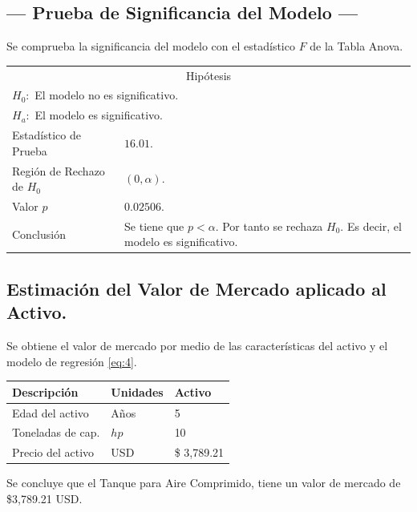 \subsection{\centering --- Prueba de Significancia del Modelo ---} %
Se comprueba la significancia del modelo con el estadístico \(F\) de la Tabla Anova.
\begin{center}
  \begin{tabular}{|l|p{6cm}|}
    \cline{1-2}
    \multicolumn{2}{|c|}{Hipótesis}\\ \cline{1-2}
    \multicolumn{2}{|l|}{\(H_0:\) El modelo no es significativo.} \\ 
    \multicolumn{2}{|l|}{\(H_a:\) El modelo es significativo.} \\ \cline{1-2}
    Estadístico de Prueba & \(16.01\).\\ \cline{1-2} 
		Región de Rechazo de \(H_0\) & \((0, \alpha )\).\\ \cline{1-2} 
    Valor \(p\) & \(0.02506\).\\ \cline{1-2} 
    Conclusión & Se tiene que \(p<\alpha\). \newline 
		Por tanto se rechaza \(H_0\). \newline 
		Es decir, el modelo es significativo.\\ \cline{1-2} 
  \end{tabular}
\end{center} 

\subsection{\centering Estimación del Valor de Mercado aplicado al Activo.} %
Se obtiene el valor de mercado por medio de las características del activo y el modelo de regresión \eqref{eq:4}.
\begin{center}
  \begin{tabular}{|l|l|l|}
    \hline 
		Descripción   & Unidades  & Activo \\ \hline 
    Edad del activo    & Años      & 5      \\ \hline 
		Toneladas de cap.  & \(hp\) & 10   \\ \hline 
		Precio del activo   & USD       & \$ 3,789.21    \\ \hline 
  \end{tabular}
\end{center} 
Se concluye que el Tanque para Aire Comprimido, tiene un valor de mercado de 
\$3,789.21 USD.

